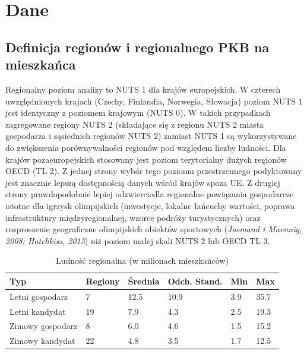 \documentclass[12pt]{article}
\begin{document}
\newpage
\section{Dane}
    \subsection{Definicja regionów i regionalnego PKB na mieszkańca}

    Regionalny poziom analizy to NUTS 1 dla krajów europejskich. W czterech uwzględnionych krajach (Czechy, Finlandia, Norwegia, Słowacja) poziom NUTS 1 jest identyczny z poziomem krajowym (NUTS 0). W takich przypadkach zagregowane regiony NUTS 2 (składające się z regionu NUTS 2 miasta gospodarza i sąsiednich regionów NUTS 2) zamiast NUTS 1 są wykorzystywane do zwiększenia porównywalności regionów pod względem liczby ludności. Dla krajów pozaeuropejskich stosowany jest poziom terytorialny dużych regionów OECD (TL 2). Z jednej strony wybór tego poziomu przestrzennego podyktowany jest znacznie lepszą dostępnością danych wśród krajów spoza UE. Z drugiej strony prawdopodobnie lepiej odzwierciedla regionalne powiązania gospodarcze istotne dla igrzysk olimpijskich (inwestycje, lokalne łańcuchy wartości, poprawa infrastruktury międzyregionalnej, wzorce podróży turystycznych) oraz rozproszenie geograficzne olimpijskich obiektów sportowych (\textit{Jasmand i Maennig, 2008; Hotchkiss, 2015}) niż poziom małej skali NUTS 2 lub OECD TL 3.

    \begin{table}[ht]
        \caption{Ludność regionalna (w milionach mieszkańców)}
        \centering
        \begin{tabular}{@{}llllll@{}}
            \toprule
            \textbf{Typ}     & \textbf{Regiony} & \textbf{Średnia} & \textbf{Odch. Stand.} & \textbf{Min} & \textbf{Max} \\ \midrule
            Letni gospodarz  & 7                & 12.5             & 10.9                  & 3.9          & 35.7         \\
            Letni kandydat   & 19               & 7.9              & 4.3                   & 2.5          & 19.3         \\
            Zimowy gospodarz & 8                & 6.0              & 4.6                   & 1.5          & 15.2         \\
            Zimowy kandydat  & 22               & 4.8              & 3.5                   & 1.7          & 12.5         \\ \bottomrule
        \end{tabular}
        \label{Tab:populacja}
    \end{table}
    
\end{document}
